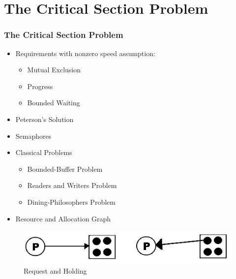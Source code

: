 \documentclass[xcolor=table, notheorems, hyperref={pdfpagelabels=false}]{beamer}
\begin{document}

\section{The Critical Section Problem}
\begin{frame}
\frametitle{The Critical Section Problem}
\begin{itemize}
\item Requirements with nonzero speed assumption:
\begin{itemize}
\item Mutual Exclusion
\item Progress
\item Bounded Waiting
\end{itemize}
\item Peterson's Solution
\item Semaphores
\item Classical Problems
\begin{itemize}
\item Bounded-Buffer Problem
\item Readers and Writers Problem
\item Dining-Philosophers Problem
\end{itemize}

\item Resource and Allocation Graph

\end{itemize}

\begin{figure}
\includegraphics[width=0.90\linewidth]{os07-graph}
\caption{Request and Holding}
\end{figure}

\end{frame}

\end{document}
